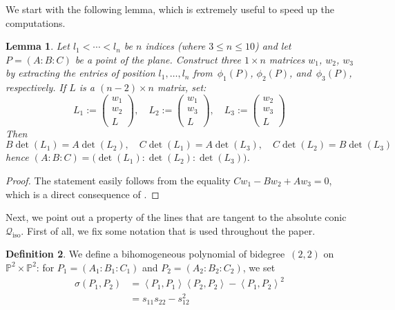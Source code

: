 \documentclass[a4paper, 11pt, reqno]{amsart}
\theoremstyle{plain}
\newtheorem{lemma}{Lemma}[section]
\theoremstyle{definition}
\newtheorem{definition}[lemma]{Definition}
\newcommand{\p}{\mathbb{P}}
\newcommand{\iso}{\mathcal{Q}_{\mathrm{iso}}}
\newcommand{\scl}[2]{\left\langle {#1}, {#2} \right\rangle}
\begin{document}
We start with the following lemma, which is extremely useful
to speed up the computations.

\begin{lemma}
\label{lemma:minors}
Let $l_1 < \cdots <l_n$ be $n$ indices (where $3 \leq n \leq 10$) and let $P = (A: B: C)$ be a point of the plane.
Construct three $1 \times n$ matrices $w_1$, $w_2$, $w_3$ by extracting the entries of position $l_1, \dotsc, l_n$ from~$\phi_1(P)$, $\phi_2(P)$, and~$\phi_3(P)$, respectively. If $L$ is a $(n-2) \times n$ matrix, set:
%
\[
  L_1 := \left( \begin{array}{c} w_1 \\ w_2 \\ L \end{array} \right), \quad
  L_2 := \left( \begin{array}{c} w_1 \\ w_3 \\ L \end{array} \right), \quad
  L_3 := \left( \begin{array}{c} w_2 \\ w_3 \\ L \end{array} \right)
\]
%
Then
%
\[
  B \det(L_1) = A \det(L_2), \quad
  C \det(L_1) = A \det(L_3), \quad
  C \det(L_2) = B \det(L_3)
\]
%
hence $(A: B: C) = \bigl( \det(L_1): \det(L_2): \det(L_3) \bigr)$.
\end{lemma}
\begin{proof}
The statement easily follows from the equality $C w_1 - B w_2 + A w_3 = 0$, which is a direct consequence of .
\end{proof}



Next, we point out a property of the lines that are tangent to the absolute conic~$\iso$.
First of all, we fix some notation that is used throughout the paper.

\begin{definition}
\label{definition:sigma}
We define a bihomogeneous polynomial of bidegree~$(2,2)$ on $\p^2 \times \p^2$: for $P_1 = (A_1: B_1: C_1)$ and $P_2 = (A_2: B_2: C_2)$, we set
%
\begin{equation}
\label{formula:sigma}
\begin{aligned}
  \sigma(P_1, P_2) &= \scl{P_1}{P_1} \scl{P_2}{P_2} - \scl{P_1}{P_2}^2 \\
   &= s_{11}s_{22}-s_{12}^2
\end{aligned}
\end{equation}
%
\end{definition}
\end{document}
